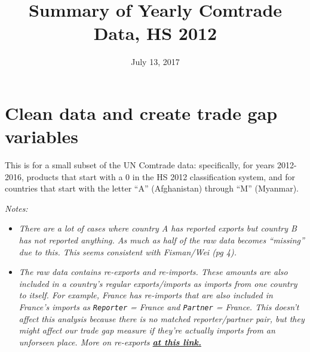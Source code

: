 \documentclass[10pt,]{article}
\title{Summary of Yearly Comtrade Data, HS 2012}
\author{}
\date{July 13, 2017}
\begin{document}
\maketitle

\section{Clean data and create trade gap
variables}\label{clean-data-and-create-trade-gap-variables}

This is for a small subset of the UN Comtrade data: specifically, for
years 2012-2016, products that start with a 0 in the HS 2012
classification system, and for countries that start with the letter
``A'' (Afghanistan) through ``M'' (Myanmar).

\emph{Notes:}

\begin{itemize}
\item
  \emph{There are a lot of cases where country A has reported exports
  but country B has not reported anything. As much as half of the raw
  data becomes ``missing'' due to this. This seems consistent with
  Fisman/Wei (pg 4).}
\item
  \emph{The raw data contains re-exports and re-imports. These amounts
  are also included in a country's regular exports/imports as imports
  from one country to itself. For example, France has re-imports that
  are also included in France's imports as \texttt{Reporter} = France
  and \texttt{Partner} = France. This doesn't affect this analysis
  because there is no matched reporter/partner pair, but they might
  affect our trade gap measure if they're actually imports from an
  unforseen place. More on re-exports
  \textbf{\href{https://unstats.un.org/unsd/tradekb/Knowledgebase/Reexports-and-Reimports}{at
  this link.}} }
\end{itemize}
\end{document}

